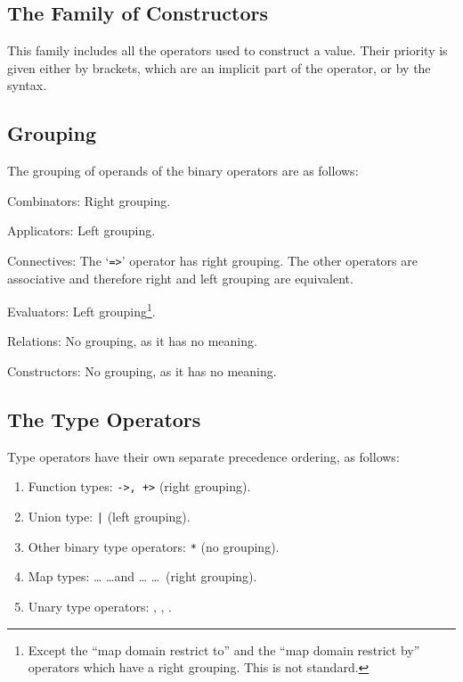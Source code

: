 \documentclass[\pformat,12pt]{article}
\newlength{\nonstandlen}
\newcommand{\nonstandard}[1]{%
\setlength{\nonstandlen}{#1\baselineskip}%
  \marginpar{\hspace*{-3mm}\raisebox{\nonstandlen}[0pt][0pt]{\fbox{{\footnotesize Non standard}}}}%
}
\begin{document}
\subsection{The Family of Constructors}

This family includes all the operators used to construct a value.  Their
priority is given either by brackets, which are an implicit part of the
operator, or by the syntax.

\subsection{Grouping}\label{grouping}

The grouping of operands of the binary operators are as follows:

\begin{list}{\bf no label!}{%
    \def\mylabel#1{\hspace\labelsep #1\hfill}
    \let\makelabel\mylabel
    \settowidth{\labelwidth}{Constructors: }
    \setlength{\leftmargin}{\labelwidth}
    \addtolength{\leftmargin}{2\labelsep}
    }
\item[Combinators:] Right grouping.

\item[Applicators:] Left grouping.

\item[Connectives:] The `{\tt =>}' operator has right grouping.  The other
  operators are associative and therefore right and left grouping are
  equivalent.
  
\item[Evaluators:] Left grouping\footnote{Except the ``map domain restrict
    to'' and the ``map domain restrict by'' operators which have a right
    grouping. This is not standard.}.

\item[Relations:] No grouping, as it has no meaning.

\item[Constructors:] No grouping, as it has no meaning.
\end{list}

\subsection{The Type Operators}\label{preceedence}

Type operators have their own separate precedence ordering, as follows:
\begin{enumerate}
\item Function types: {\tt ->, +>} (right grouping).

\item Union type: {\tt |} (left grouping).

\item Other binary type operators: \verb+*+ (no grouping).

\item Map types:  \ldots {} \ldots and  \ldots
   \ldots\ (right grouping).\nonstandard{0}

\item Unary type operators: , , .
\end{enumerate}
\end{document}
